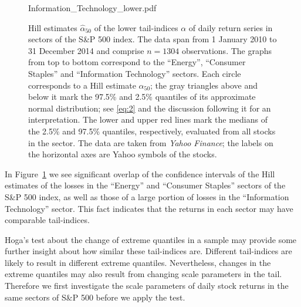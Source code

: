 \begin{figure}[htb!]
\begin{minipage}{1.0\linewidth}
    {Information_Technology_lower.pdf}
  \end{minipage}
  \caption{\small Hill estimates $\hat \alpha_{50}$ of the lower tail-indices $\alpha$ of
    daily return series in sectors of the S\&P 500
    index. The data span
    from 1 January 2010 to 31 December 2014 and comprise $n=1304$ observations.
The graphs from top to bottom correspond to the ``Energy'',
    ``Consumer Staples'' and ``Information Technology'' sectors.
    Each circle corresponds to a Hill estimate $\hat\alpha_{50}$; the gray
    triangles above and below it mark the 97.5\% and 2.5\% quantiles
    of its approximate normal distribution; see \eqref{eq:2} and the discussion following it for an 
interpretation.
    The lower and upper red lines mark the medians of the 2.5\% 
    and 97.5\% quantiles, respectively, evaluated from all stocks in the sector.
    The data are taken from {\it Yahoo Finance}; the labels on
    the horizontal axes are Yahoo symbols of the stocks. 
  }\label{fig:1}
\end{figure}

In Figure~\ref{fig:1} we see significant overlap of the confidence intervals of the Hill
estimates of the losses in the ``Energy'' and ``Consumer Staples''
sectors of the S\&P 500 index, as well as those of a 
large portion of losses in the ``Information Technology'' sector.
This fact indicates that the returns in each sector may 
have comparable tail-indices.
\par
Hoga's \cite{hoga:2016} test about the change of extreme quantiles
in a sample
may provide some further insight about how similar these tail-indices are.
Different tail-indices are likely to result in different
extreme quantiles. Nevertheless, changes in the extreme quantiles may also
result from changing scale parameters in the tail. Therefore  we first investigate the scale
parameters of daily stock returns in the same sectors of S\&P 500 before we apply the test.


